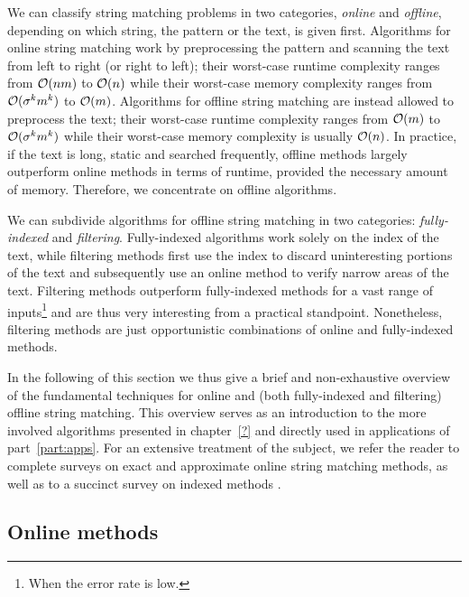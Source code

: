 We can classify string matching problems in two categories, \emph{online} and \emph{offline}, depending on which string, the pattern or the text, is given first.
Algorithms for online string matching work by preprocessing the pattern and scanning the text from left to right (or right to left); their worst-case runtime complexity ranges from $\mathcal{O}(nm)$ to $\mathcal{O}(n)$ while their worst-case memory complexity ranges from $\mathcal{O}(\sigma^k m^k)$ to $\mathcal{O}(m)$.
Algorithms for offline string matching are instead allowed to preprocess the text; their worst-case runtime complexity ranges from $\mathcal{O}(m)$ to $\mathcal{O}(\sigma^k m^k)$ while their worst-case memory complexity is usually $\mathcal{O}(n)$.
In practice, if the text is long, static and searched frequently, offline methods largely outperform online methods in terms of runtime, provided the necessary amount of memory. Therefore, we concentrate on offline algorithms.

We can subdivide algorithms for offline string matching in two categories: \emph{fully-indexed} and \emph{filtering}.
Fully-indexed algorithms work solely on the index of the text, while filtering methods first use the index to discard uninteresting portions of the text and subsequently use an online method to verify narrow areas of the text.
Filtering methods outperform fully-indexed methods for a vast range of inputs\footnote{When the error rate is low.} and are thus very interesting from a practical standpoint. Nonetheless, filtering methods are just opportunistic combinations of online and fully-indexed methods.

In the following of this section we thus give a brief and non-exhaustive overview of the fundamental techniques for online and (both fully-indexed and filtering) offline string matching.
This overview serves as an introduction to the more involved algorithms presented in chapter~\ref{?} and directly used in applications of part~\ref{part:apps}.
For an extensive treatment of the subject, we refer the reader to complete surveys on exact \citep{Faro2013} and approximate \citep{Navarro2001b} online string matching methods, as well as to a succinct survey on indexed methods \citep{Navarro2001}.


\subsection{Online methods}
\label{sub:introonline}


